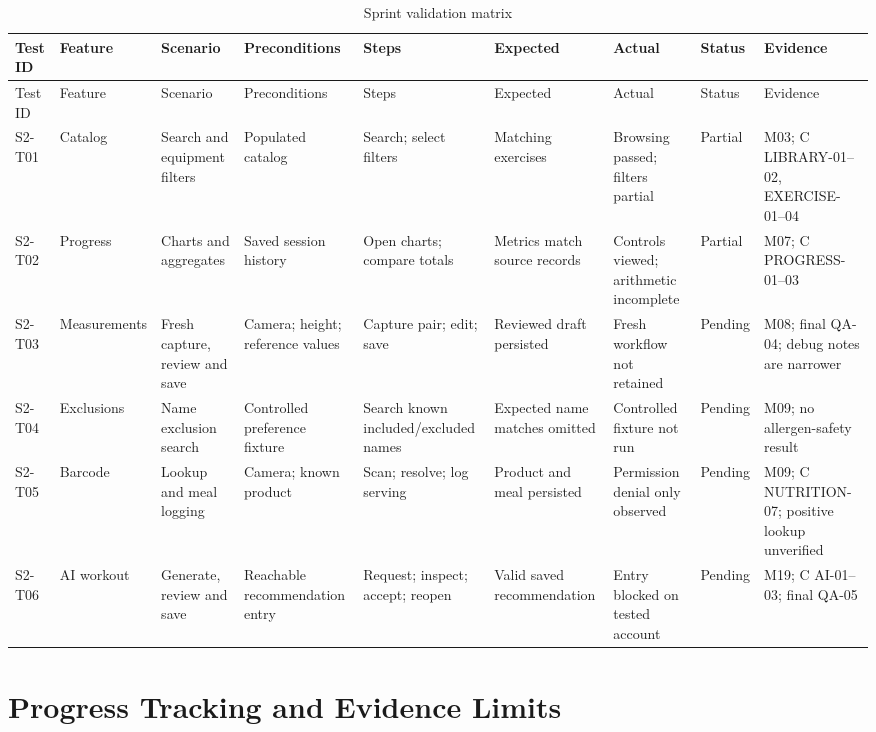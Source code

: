 \documentclass[12pt,a4paper,openany]{report}
\begin{document}
\begingroup
\scriptsize
\setlength{\tabcolsep}{2pt}
\renewcommand{\arraystretch}{1.20}
\setlength{\LTpre}{5pt}
\setlength{\LTpost}{10pt}
\begin{longtable}{|L{1.20cm}|L{1.50cm}|L{1.60cm}|L{1.60cm}|L{1.80cm}|L{1.80cm}|L{1.65cm}|L{1.35cm}|L{2.00cm}|}
\caption{Sprint validation matrix}\label{tab:pdf-64-30} \\
\hline
{}
Test ID & Feature & Scenario & Preconditions & Steps & Expected & Actual & Status & Evidence \\ \hline
\endfirsthead
\hline
{}
Test ID & Feature & Scenario & Preconditions & Steps & Expected & Actual & Status & Evidence \\ \hline
\endhead
S2-T01 & Catalog & Search and equipment filters & Populated catalog & Search; select filters & Matching exercises & Browsing passed; filters partial & Partial & M03; C LIBRARY-01--02, EXERCISE-01--04 \\ \hline
S2-T02 & Progress & Charts and aggregates & Saved session history & Open charts; compare totals & Metrics match source records & Controls viewed; arithmetic incomplete & Partial & M07; C PROGRESS-01--03 \\ \hline
S2-T03 & Measurements & Fresh capture, review and save & Camera; height; reference values & Capture pair; edit; save & Reviewed draft persisted & Fresh workflow not retained & Pending & M08; final QA-04; debug notes are narrower \\ \hline
S2-T04 & Exclusions & Name exclusion search & Controlled preference fixture & Search known included\slash{}excluded names & Expected name matches omitted & Controlled fixture not run & Pending & M09; no allergen-safety result \\ \hline
S2-T05 & Barcode & Lookup and meal logging & Camera; known product & Scan; resolve; log serving & Product and meal persisted & Permission denial only observed & Pending & M09; C NUTRITION-07; positive lookup unverified \\ \hline
S2-T06 & AI workout & Generate, review and save & Reachable recommendation entry & Request; inspect; accept; reopen & Valid saved recommendation & Entry blocked on tested account & Pending & M19; C AI-01--03; final QA-05 \\ \hline
\end{longtable}
\endgroup

\section{Progress Tracking and Evidence Limits}
\end{document}
